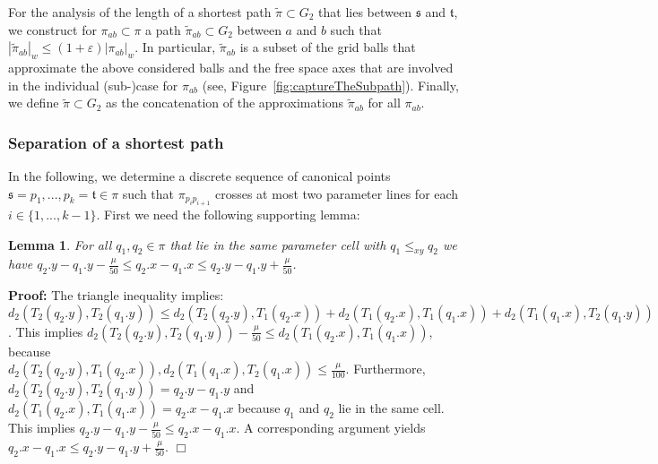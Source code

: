 \documentclass[a4paper,11pt]{article}
\newtheorem{lemma}{Lemma}
\newenvironment{proof}{\textbf{Proof:}}{\hspace*{0mm}\hfill\ensuremath{\Box}}
\begin{document}
	For the analysis of the length of a shortest path $\widetilde{\pi} \subset G_2$ that lies between $\mathfrak{s}$ and $\mathfrak{t}$, we construct for $\pi_{ab} \subset \pi$ a path $\widetilde{\pi}_{ab} \subset G_2$ between $a$ and $b$ such that $|\widetilde{\pi}_{ab}|_{w} \leq (1 + \varepsilon) |\pi_{ab}|_w$. In particular, $\widetilde{\pi}_{ab}$ is a subset of the grid balls that approximate the above considered balls and the free space axes that are involved in the individual (sub-)case for $\pi_{ab}$ (see, Figure~\ref{fig:captureTheSubpath}). Finally, we define $\widetilde{\pi} \subset G_2$ as the concatenation of the approximations $\widetilde{\pi}_{ab}$ for all $\pi_{ab}$.
		
\subsubsection{Separation of a shortest path}\label{subsec:Sep}
	
	In the following, we determine a discrete sequence of canonical points $\mathfrak{s} = p_1,...,p_k = \mathfrak{t} \in \pi$ such that $\pi_{p_ip_{i+1}}$ crosses at most two parameter lines for each $i \in \{ 1,...,k-1 \}$. First we need the following supporting lemma:
	
\begin{lemma}\label{lem:tech}
	For all $q_1, q_2 \in \pi$ that lie in the same parameter cell with $q_1 \leq_{xy} q_2$ we have $q_2.y-q_1.y - \frac{\mu}{50} \leq q_2.x-q_1.x \leq q_2.y-q_1.y + \frac{\mu}{50}$.
\end{lemma}
\begin{proof}
	The triangle inequality implies:\\
	 $d_2(T_2(q_2.y),T_2(q_1.y)) \leq d_2(T_2(q_2.y),T_1(q_2.x)) + d_2(T_1(q_2.x),T_1(q_1.x)) + d_2(T_1(q_1.x),T_2(q_1.y))$. This implies $d_2(T_2(q_2.y),T_2(q_1.y)) - \frac{\mu}{50} \leq d_2(T_1(q_2.x),T_1(q_1.x))$, 
because\\ $d_2(T_2(q_2.y),T_1(q_2.x)), d_2(T_1(q_1.x), T_2(q_1.x)) \leq \frac{\mu}{100}$. Furthermore, $d_2(T_2(q_2.y),T_2(q_1.y)) = q_2.y-q_1.y$ and $d_2(T_1(q_2.x), T_1(q_1.x)) = q_2.x - q_1.x$ because $q_1$ and $q_2$ lie in the same cell. This implies $q_2.y-q_1.y - \frac{\mu}{50} \leq q_2.x-q_1.x$. 	A corresponding argument yields $q_2.x-q_1.x \leq q_2.y-q_1.y + \frac{\mu}{50}$.
\end{proof}
\end{document}
